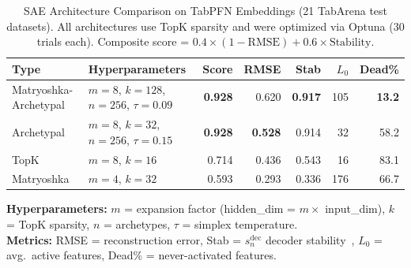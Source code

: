 \begin{table}[t]
\caption{SAE Architecture Comparison on TabPFN Embeddings (21 TabArena test datasets). All architectures use TopK sparsity and were optimized via Optuna (30 trials each). Composite score = $0.4 \times (1 - \text{RMSE}) + 0.6 \times \text{Stability}$.}
\label{tab:sae_comparison}
\centering
\small
\begin{tabular}{l l r r r r r}
\toprule
Type & Hyperparameters & Score & RMSE & Stab & $L_0$ & Dead\% \\
\midrule
Matryoshka-Archetypal & $m{=}8$, $k{=}128$, $n{=}256$, $\tau{=}0.09$ & \textbf{0.928} & 0.620 & \textbf{0.917} & 105 & \textbf{13.2} \\
Archetypal & $m{=}8$, $k{=}32$, $n{=}256$, $\tau{=}0.15$ & \textbf{0.928} & \textbf{0.528} & 0.914 & 32 & 58.2 \\
TopK & $m{=}8$, $k{=}16$ & 0.714 & 0.436 & 0.543 & 16 & 83.1 \\
Matryoshka & $m{=}4$, $k{=}32$ & 0.593 & 0.293 & 0.336 & 176 & 66.7 \\
\bottomrule
\end{tabular}

\vspace{0.5em}
\footnotesize
\textbf{Hyperparameters:} $m$ = expansion factor (hidden\_dim = $m \times$ input\_dim), $k$ = TopK sparsity, $n$ = archetypes, $\tau$ = simplex temperature. \\
\textbf{Metrics:} RMSE = reconstruction error, Stab = $s_n^{\text{dec}}$ decoder stability~\cite{chanin2025archetypal}, $L_0$ = avg.\ active features, Dead\% = never-activated features.
\end{table}
